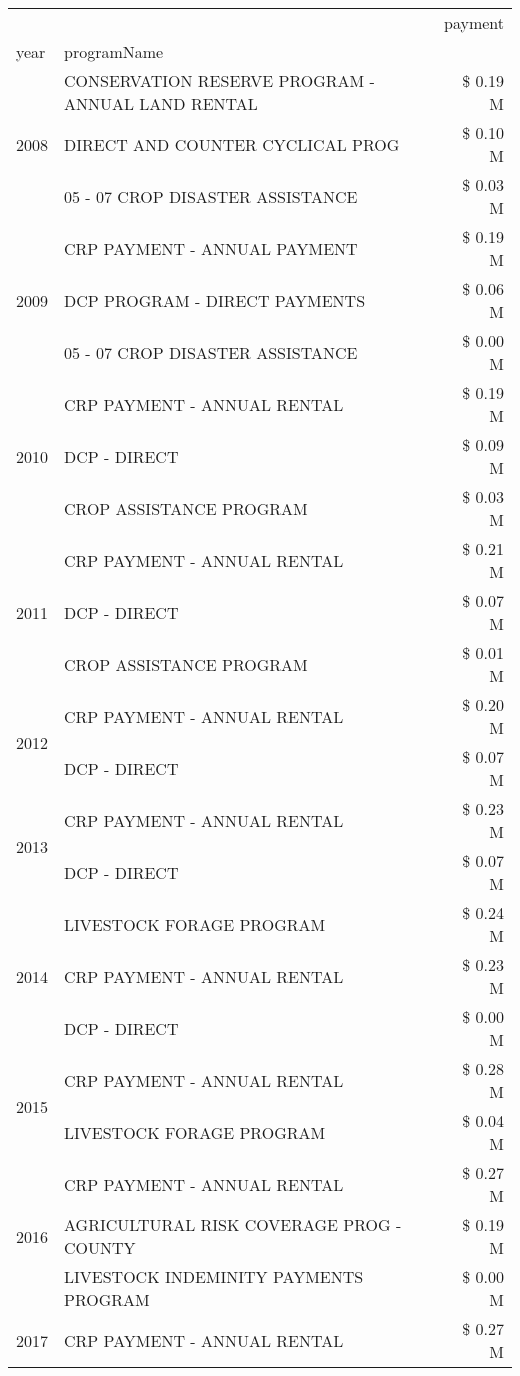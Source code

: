\begin{tabular}{llr}
\toprule
 &  & payment \\
year & programName &  \\
\midrule
\multirow[t]{3}{*}{2008} & CONSERVATION RESERVE PROGRAM - ANNUAL LAND RENTAL & \$ 0.19 M \\
 & DIRECT AND COUNTER CYCLICAL PROG & \$ 0.10 M \\
 & 05 - 07 CROP DISASTER ASSISTANCE & \$ 0.03 M \\
\cline{1-3}
\multirow[t]{3}{*}{2009} & CRP PAYMENT - ANNUAL PAYMENT & \$ 0.19 M \\
 & DCP PROGRAM - DIRECT PAYMENTS & \$ 0.06 M \\
 & 05 - 07 CROP DISASTER ASSISTANCE & \$ 0.00 M \\
\cline{1-3}
\multirow[t]{3}{*}{2010} & CRP PAYMENT - ANNUAL RENTAL & \$ 0.19 M \\
 & DCP - DIRECT & \$ 0.09 M \\
 & CROP ASSISTANCE PROGRAM & \$ 0.03 M \\
\cline{1-3}
\multirow[t]{3}{*}{2011} & CRP PAYMENT - ANNUAL RENTAL & \$ 0.21 M \\
 & DCP - DIRECT & \$ 0.07 M \\
 & CROP ASSISTANCE PROGRAM & \$ 0.01 M \\
\cline{1-3}
\multirow[t]{2}{*}{2012} & CRP PAYMENT - ANNUAL RENTAL & \$ 0.20 M \\
 & DCP - DIRECT & \$ 0.07 M \\
\cline{1-3}
\multirow[t]{2}{*}{2013} & CRP PAYMENT - ANNUAL RENTAL & \$ 0.23 M \\
 & DCP - DIRECT & \$ 0.07 M \\
\cline{1-3}
\multirow[t]{3}{*}{2014} & LIVESTOCK FORAGE PROGRAM & \$ 0.24 M \\
 & CRP PAYMENT - ANNUAL RENTAL & \$ 0.23 M \\
 & DCP - DIRECT & \$ 0.00 M \\
\cline{1-3}
\multirow[t]{2}{*}{2015} & CRP PAYMENT - ANNUAL RENTAL & \$ 0.28 M \\
 & LIVESTOCK FORAGE PROGRAM & \$ 0.04 M \\
\cline{1-3}
\multirow[t]{3}{*}{2016} & CRP PAYMENT - ANNUAL RENTAL & \$ 0.27 M \\
 & AGRICULTURAL RISK COVERAGE PROG - COUNTY & \$ 0.19 M \\
 & LIVESTOCK INDEMINITY PAYMENTS PROGRAM & \$ 0.00 M \\
\cline{1-3}
\multirow[t]{3}{*}{2017} & CRP PAYMENT - ANNUAL RENTAL & \$ 0.27 M \\

\end{tabular}
